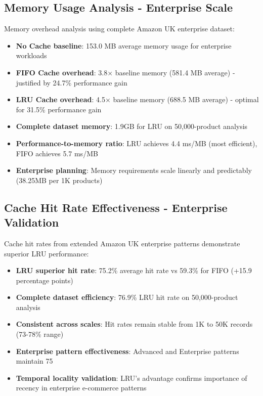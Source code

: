 \documentclass{article}
\begin{document}
\subsection{Memory Usage Analysis - Enterprise Scale}

Memory overhead analysis using complete Amazon UK enterprise dataset:

\begin{itemize}
    \item \textbf{No Cache baseline}: 153.0 MB average memory usage for enterprise workloads
    \item \textbf{FIFO Cache overhead}: 3.8× baseline memory (581.4 MB average) - justified by 24.7\% performance gain
    \item \textbf{LRU Cache overhead}: 4.5× baseline memory (688.5 MB average) - optimal for 31.5\% performance gain
    \item \textbf{Complete dataset memory}: 1.9GB for LRU on 50,000-product analysis
    \item \textbf{Performance-to-memory ratio}: LRU achieves 4.4 ms/MB (most efficient), FIFO achieves 5.7 ms/MB
    \item \textbf{Enterprise planning}: Memory requirements scale linearly and predictably (38.25MB per 1K products)
\end{itemize}

\subsection{Cache Hit Rate Effectiveness - Enterprise Validation}

Cache hit rates from extended Amazon UK enterprise patterns demonstrate superior LRU performance:

\begin{itemize}
    \item \textbf{LRU superior hit rate}: 75.2\% average hit rate vs 59.3\% for FIFO (+15.9 percentage points)
    \item \textbf{Complete dataset efficiency}: 76.9\% LRU hit rate on 50,000-product analysis
    \item \textbf{Consistent across scales}: Hit rates remain stable from 1K to 50K records (73-78\% range)
    \item \textbf{Enterprise pattern effectiveness}: Advanced and Enterprise patterns maintain 75%
    \item \textbf{Temporal locality validation}: LRU's advantage confirms importance of recency in enterprise e-commerce patterns
\end{itemize}
\end{document}
